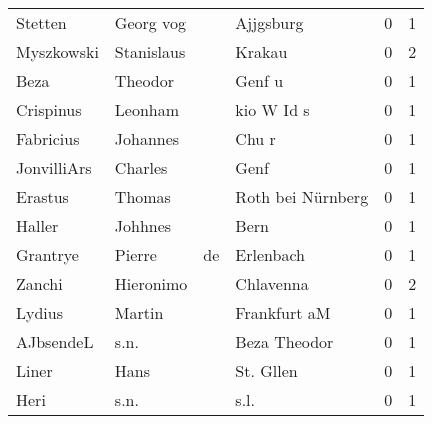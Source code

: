 \begin{center}
\begin{tiny}
\begin{longtabu}{llllrr}
                  Stetten &                          Georg vog &             &                                   Ajjgsburg &          0 &         1 \\
               Myszkowski &                         Stanislaus &             &                                      Krakau &          0 &         2 \\
                     Beza &                            Theodor &             &                                      Genf u &          0 &         1 \\
                Crispinus &                            Leonham &             &                                  kio W Id s &          0 &         1 \\
                Fabricius &                           Johannes &             &                                       Chu r &          0 &         1 \\
              JonvilliArs &                            Charles &             &                                        Genf &          0 &         1 \\
                  Erastus &                             Thomas &             &                           Roth bei Nürnberg &          0 &         1 \\
                   Haller &                            Johhnes &             &                                        Bern &          0 &         1 \\
                 Grantrye &                             Pierre &          de &                                   Erlenbach &          0 &         1 \\
                   Zanchi &                          Hieronimo &             &                                   Chlavenna &          0 &         2 \\
                   Lydius &                             Martin &             &                                Frankfurt aM &          0 &         1 \\
                AJbsendeL &                               s.n. &             &                                Beza Theodor &          0 &         1 \\
                    Liner &                               Hans &             &                                   St. Gllen &          0 &         1 \\
                     Heri &                               s.n. &             &                                        s.l. &          0 &         1 \\

\end{longtabu}
\end{tiny}
\end{center}

